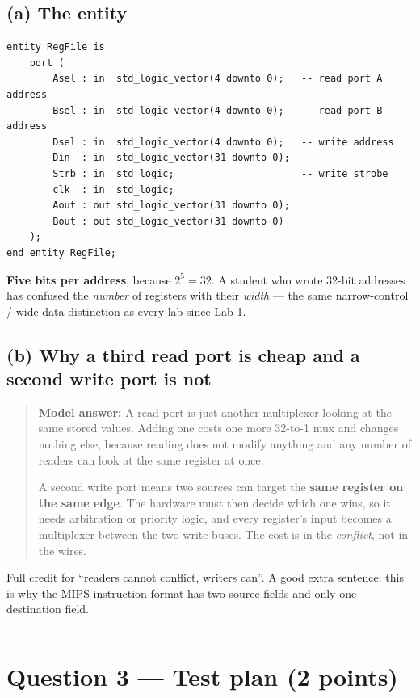 \documentclass[11pt]{article}
\newcommand{\hr}{\vspace{2pt}\hrule\vspace{6pt}}
\begin{document}
\subsection*{(a) The entity}

\begin{lstlisting}
entity RegFile is
    port (
        Asel : in  std_logic_vector(4 downto 0);   -- read port A address
        Bsel : in  std_logic_vector(4 downto 0);   -- read port B address
        Dsel : in  std_logic_vector(4 downto 0);   -- write address
        Din  : in  std_logic_vector(31 downto 0);
        Strb : in  std_logic;                      -- write strobe
        clk  : in  std_logic;
        Aout : out std_logic_vector(31 downto 0);
        Bout : out std_logic_vector(31 downto 0)
    );
end entity RegFile;
\end{lstlisting}

\textbf{Five bits per address}, because $2^5 = 32$. A student who wrote 32-bit
addresses has confused the \emph{number} of registers with their \emph{width} ---
the same narrow-control / wide-data distinction as every lab since Lab 1.

\subsection*{(b) Why a third read port is cheap and a second write port is not}

\begin{quote}
\textbf{Model answer:} A read port is just another multiplexer looking at the
same stored values. Adding one costs one more 32-to-1 mux and changes nothing
else, because reading does not modify anything and any number of readers can look
at the same register at once.

A second write port means two sources can target the \textbf{same register on the
same edge}. The hardware must then decide which one wins, so it needs arbitration
or priority logic, and every register's input becomes a multiplexer between the
two write buses. The cost is in the \emph{conflict}, not in the wires.
\end{quote}

Full credit for ``readers cannot conflict, writers can''. A good extra sentence:
this is why the MIPS instruction format has two source fields and only one
destination field.

\vspace{4pt}\hr

\section*{Question 3 --- Test plan (2 points)}
\end{document}
